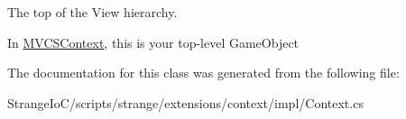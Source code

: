 The top of the View hierarchy. 

In \hyperlink{classstrange_1_1extensions_1_1context_1_1impl_1_1_m_v_c_s_context}{M\-V\-C\-S\-Context}, this is your top-\/level Game\-Object 

The documentation for this class was generated from the following file\-:\begin{DoxyCompactItemize}
\item 
Strange\-Io\-C/scripts/strange/extensions/context/impl/Context.\-cs\end{DoxyCompactItemize}
